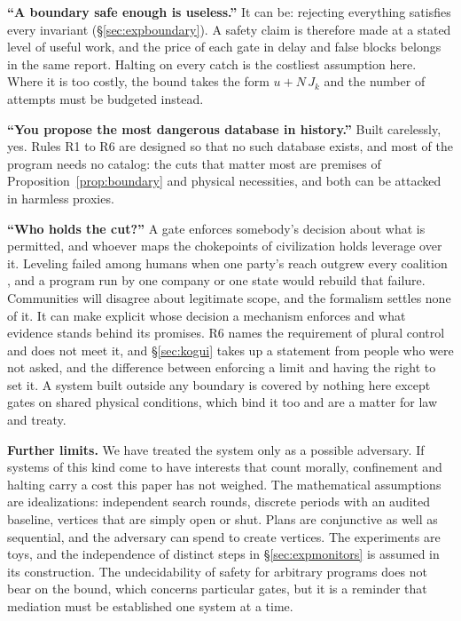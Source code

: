 \documentclass[10pt,twocolumn,letterpaper]{article}
\theoremstyle{definition}
\newcommand{\para}[1]{\smallskip\noindent\textbf{#1}\enspace}
\begin{document}
\para{``A boundary safe enough is useless.''} It can be: rejecting everything satisfies every invariant (\S\ref{sec:expboundary}). A safety claim is therefore made at a stated level of useful work, and the price of each gate in delay and false blocks belongs in the same report. Halting on every catch is the costliest assumption here. Where it is too costly, the bound takes the form $u+N\,J_{k}$ and the number of attempts must be budgeted instead.

\para{``You propose the most dangerous database in history.''} Built carelessly, yes. Rules R1 to R6 are designed so that no such database exists, and most of the program needs no catalog: the cuts that matter most are premises of Proposition~\ref{prop:boundary} and physical necessities, and both can be attacked in harmless proxies.

\para{``Who holds the cut?''} A gate enforces somebody's decision about what is permitted, and whoever maps the chokepoints of civilization holds leverage over it. Leveling failed among humans when one party's reach outgrew every coalition \cite{betzig}, and a program run by one company or one state would rebuild that failure. Communities will disagree about legitimate scope, and the formalism settles none of it. It can make explicit whose decision a mechanism enforces and what evidence stands behind its promises. R6 names the requirement of plural control and does not meet it, and \S\ref{sec:kogui} takes up a statement from people who were not asked, and the difference between enforcing a limit and having the right to set it. A system built outside any boundary is covered by nothing here except gates on shared physical conditions, which bind it too and are a matter for law and treaty.

\para{Further limits.} We have treated the system only as a possible adversary. If systems of this kind come to have interests that count morally, confinement and halting carry a cost this paper has not weighed. The mathematical assumptions are idealizations: independent search rounds, discrete periods with an audited baseline, vertices that are simply open or shut. Plans are conjunctive as well as sequential, and the adversary can spend to create vertices. The experiments are toys, and the independence of distinct steps in \S\ref{sec:expmonitors} is assumed in its construction. The undecidability of safety for arbitrary programs \cite{alfonseca} does not bear on the bound, which concerns particular gates, but it is a reminder that mediation must be established one system at a time.
\end{document}
